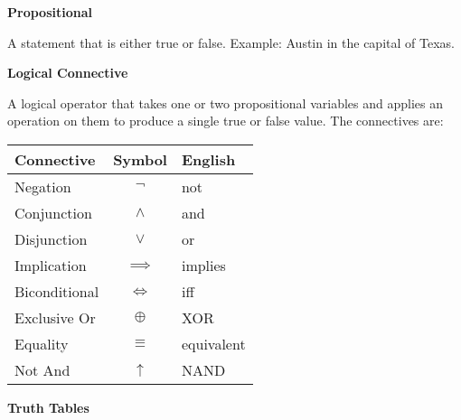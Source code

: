 \documentclass{article}
\numberwithin{theorem}{subsection}
\numberwithin{theorem}{subsubsection}
\theoremstyle{definition}
\numberwithin{definition}{subsection}
\numberwithin{definition}{subsubsection}
\begin{document}
\begin{flushleft}
\textbf{Propositional}
\end{flushleft}
A statement that is either true or false. Example: Austin in the capital of Texas.


\begin{flushleft}
\textbf{Logical Connective}
\end{flushleft}
A logical operator that takes one or two propositional variables and applies an operation on them to produce a single true or false value. The connectives are:


\begin{table}[H]
  \begin{center}
    \begin{tabular}{l|c|l} %
      \textbf{Connective} & \textbf{Symbol} & \textbf{English}\\
      \hline
      Negation & $\neg$ & not\\
      Conjunction & $\wedge$ & and\\
      Disjunction & $\vee$ & or\\
      Implication & $\implies$ & implies\\
      Biconditional & $\iff$ & iff\\
      Exclusive Or & $\oplus$ & XOR\\
      Equality & $\equiv$ & equivalent\\
      Not And & $\uparrow$ & NAND\\
    \end{tabular}
  \end{center}
\end{table}

\begin{flushleft}
\textbf{Truth Tables}
\end{flushleft}
\end{document}
